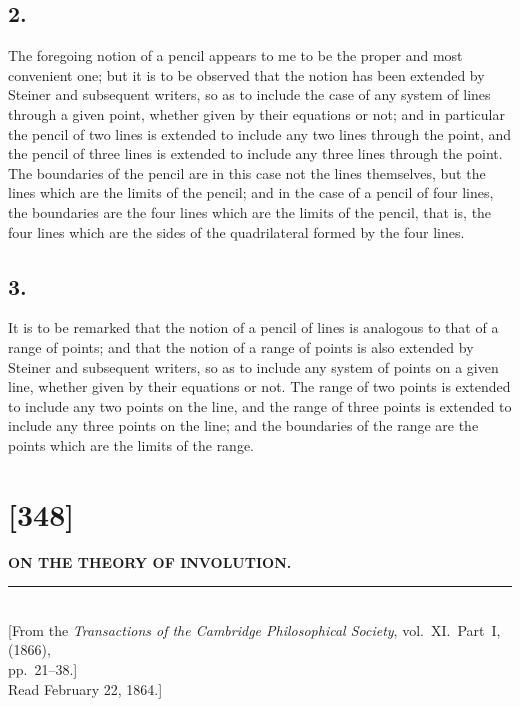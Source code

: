\documentclass[11pt,a4paper]{article}
\theoremstyle{definition}
\begin{document}
\newpage
\subsection*{2.}

The foregoing notion of a pencil appears to me to be the proper and most convenient
one; but it is to be observed that the notion has been extended by Steiner and subsequent
writers, so as to include the case of any system of lines through a given point, whether
given by their equations or not; and in particular the pencil of two lines is extended to
include any two lines through the point, and the pencil of three lines is extended to
include any three lines through the point. The boundaries of the pencil are in this case
not the lines themselves, but the lines which are the limits of the pencil; and in the case
of a pencil of four lines, the boundaries are the four lines which are the limits of the
pencil, that is, the four lines which are the sides of the quadrilateral formed by the four
lines.

\subsection*{3.}

It is to be remarked that the notion of a pencil of lines is analogous to that of a range
of points; and that the notion of a range of points is also extended by Steiner and subsequent
writers, so as to include any system of points on a given line, whether given by their
equations or not. The range of two points is extended to include any two points on the
line, and the range of three points is extended to include any three points on the line;
and the boundaries of the range are the points which are the limits of the range.

\newpage
\section*{[348]}

\begin{center}
{\large\bfseries ON THE THEORY OF INVOLUTION.}\\[8pt]
\rule{0.5\textwidth}{0.4pt}\\[6pt]
{\small [From the \textit{Transactions of the Cambridge Philosophical Society}, vol.~XI.\ Part~I, (1866),}\\
{\small pp.~21--38.]}\\[4pt]
{\small Read February 22, 1864.]}
\end{center}
\end{document}

